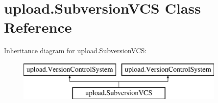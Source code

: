 \hypertarget{classupload_1_1SubversionVCS}{}\section{upload.\+Subversion\+V\+CS Class Reference}
\label{classupload_1_1SubversionVCS}
Inheritance diagram for upload.\+Subversion\+V\+CS\+:\begin{figure}[H]
\begin{center}
\leavevmode
\includegraphics[height=2.000000cm]{classupload_1_1SubversionVCS}
\end{center}
\end{figure}
